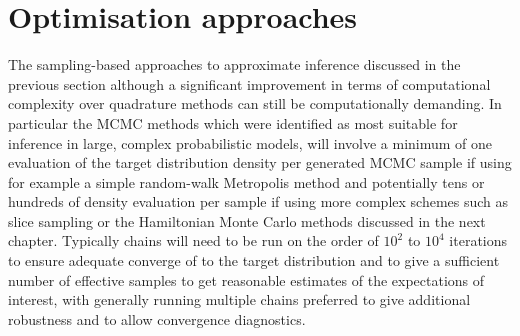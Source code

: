 



\section{Optimisation approaches}

The sampling-based approaches to approximate inference discussed in the previous section although a significant improvement in terms of computational complexity over quadrature methods can still be computationally demanding. In particular the \ac{MCMC} methods which were identified as most suitable for inference in large, complex probabilistic models, will involve a minimum of one evaluation of the target distribution density per generated \ac{MCMC} sample if using for example a simple random-walk Metropolis method and potentially tens or hundreds of density evaluation per sample if using more complex schemes such as slice sampling or the Hamiltonian Monte Carlo methods discussed in the next chapter. Typically chains will need to be run on the order of $10^2$ to $10^4$ iterations to ensure adequate converge of to the target distribution and to give a sufficient number of effective samples to get reasonable estimates of the expectations of interest, with generally running multiple chains preferred to give additional robustness and to allow convergence diagnostics.

